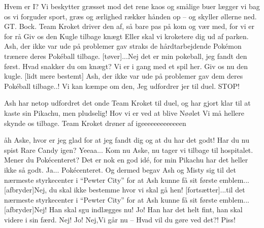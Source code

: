 \documentclass[a4paper,11pt]{article}
\begin{document}
\begin{sketch}
 Hvem er I?
 Vi beskytter græsset mod det rene kaos
 og smålige buer lægger vi bag os
 vi forguder sport, græs og ærlighed
rækker hånden op – og skyller øllerne ned.
GT.
Bock.
Team Kroket driver den af, så bare pas på
 kom og vær med, for vi er for rå
 Giv os den Kugle tilbage knægt
 Eller skal vi kroketere dig ud af parken.
 Ash, der ikke var ude på problemer gav straks de hårdtarbejdende Pokémon trænere deres Pokéball tilbage.
[tøver]...Nej det er min pokeball, jeg fandt den først.
 Hvad snakker du om knægt?
 Vi er i gang med et spil her.
 Giv os nu den kugle.
[lidt mere bestemt] Ash, der ikke var ude på problemer gav dem deres Pokéball tilbage..!
 Vi kan kæmpe om den, Jeg udfordrer jer til duel.
 STOP!


 Ash har netop udfordret det onde Team Kroket til duel, og har gjort klar til at kaste sin Pikachu, men pludselig!
 Hov vi er ved at blive Nøølet  Vi må hellere skynde os tilbage.
 Team Kroket drøner af igeeeeeeeeeeeeen

åh Aske, hvor er jeg glad for at jeg fandt dig og at du har det godt! Har du nu spist Rare Candy igen?
Yeeaa...
Kom nu Aske, nu tager vi tilbage til hospitalet.
Mener du Pokécenteret? Det er nok en god idé, for min Pikachu har det heller ikke så godt.
Ja... Pokécenteret.
Og dermed begav Ash og Misty sig til det nærmeste styrkecenter i “Pewter City” for at Ash kunne få sit første emblem...
[afbryder]Nej, du skal ikke bestemme hvor vi skal gå hen!
[fortsætter]...til det nærmeste styrkecenter i “Pewter City” for at Ash kunne få sit første emblem...
[afbryder]Nej! Han skal sgu indlægges nu!
Jo! Han har det helt fint, han skal videre i sin færd.
Nej!
Jo!
Nej,Vi går nu -- Hvad vil du gøre ved det?!
Piss!


\end{sketch}
\end{document}
